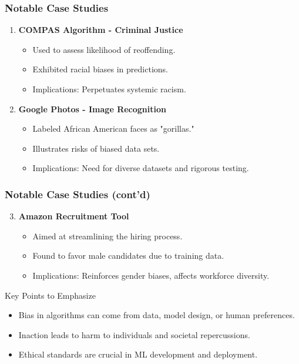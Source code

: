 \documentclass[aspectratio=169]{beamer}
\begin{document}
\begin{frame}[fragile]
    \frametitle{Notable Case Studies}
    \begin{enumerate}
        \item \textbf{COMPAS Algorithm - Criminal Justice}
            \begin{itemize}
                \item Used to assess likelihood of reoffending.
                \item Exhibited racial biases in predictions.
                \item Implications: Perpetuates systemic racism.
            \end{itemize}
        \item \textbf{Google Photos - Image Recognition}
            \begin{itemize}
                \item Labeled African American faces as "gorillas."
                \item Illustrates risks of biased data sets.
                \item Implications: Need for diverse datasets and rigorous testing.
            \end{itemize}
    \end{enumerate}
\end{frame}

\begin{frame}[fragile]
    \frametitle{Notable Case Studies (cont'd)}
    \begin{enumerate}
        \setcounter{enumi}{2} %
        \item \textbf{Amazon Recruitment Tool}
            \begin{itemize}
                \item Aimed at streamlining the hiring process.
                \item Found to favor male candidates due to training data.
                \item Implications: Reinforces gender biases, affects workforce diversity.
            \end{itemize}
    \end{enumerate}
    \begin{block}{Key Points to Emphasize}
        \begin{itemize}
            \item Bias in algorithms can come from data, model design, or human preferences.
            \item Inaction leads to harm to individuals and societal repercussions.
            \item Ethical standards are crucial in ML development and deployment.
        \end{itemize}
    \end{block}
\end{frame}
\end{document}
